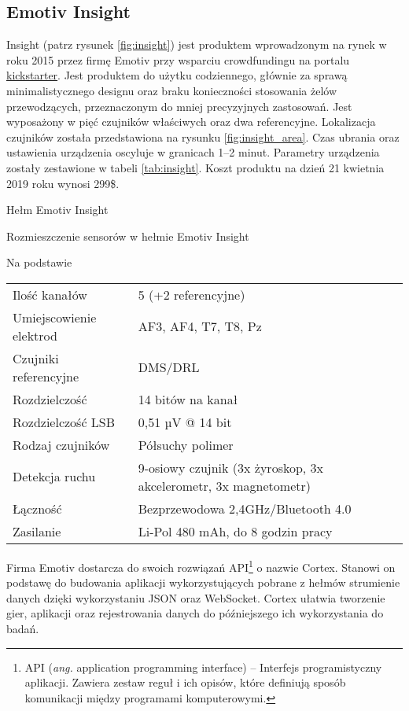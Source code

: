\documentclass[skorowidz,skroty]{dyplomWEZUT}
\begin{document}
\subsection{Emotiv Insight\label{subsection:insight}}
Insight (patrz rysunek \vref{fig:insight}) jest produktem wprowadzonym na rynek w roku 2015 przez firmę Emotiv przy wsparciu crowdfundingu na portalu \href{www.kickstarter.com}{kickstarter}. Jest produktem do użytku codziennego, głównie za sprawą minimalistycznego designu oraz braku konieczności stosowania żelów przewodzących, przeznaczonym do mniej precyzyjnych zastosowań. Jest wyposażony w pięć czujników właściwych oraz dwa referencyjne. Lokalizacja czujników została przedstawiona na rysunku \vref{fig:insight_area}. Czas ubrania oraz ustawienia urządzenia oscyluje w granicach 1--2 minut. Parametry urządzenia zostały zestawione w tabeli \vref{tab:insight}. Koszt produktu na dzień 21 kwietnia 2019 roku wynosi 299\$.

{Hełm Emotiv Insight\label{fig:insight}}
{\cite{emotiv_insight}}

{Rozmieszczenie sensorów w hełmie Emotiv Insight\label{fig:insight_area}}
{\cite{emotiv_insight}}

{Na podstawie \cite{emotiv_comparison}}
{
    \begin{tabular}{l|l}
        Ilość kanałów & 5 (+2 referencyjne)\\
        Umiejscowienie elektrod & AF3, AF4, T7, T8, Pz\\
        Czujniki referencyjne & DMS/DRL\\
        Rozdzielczość & 14 bitów na kanał\\
        Rozdzielczość LSB & 0,51 µV @ 14 bit\\
        Rodzaj czujników & Półsuchy polimer\\
        Detekcja ruchu & 9-osiowy czujnik (3x żyroskop, 3x akcelerometr, 3x magnetometr)\\
        Łączność & Bezprzewodowa 2,4GHz/Bluetooth 4.0\\
        Zasilanie & Li-Pol 480 mAh, do 8 godzin pracy
    \end{tabular}
}

Firma Emotiv dostarcza do swoich rozwiązań API\footnote{API (\textit{ang.} application programming interface) -- Interfejs programistyczny aplikacji. Zawiera zestaw reguł i ich opisów, które definiują sposób komunikacji między programami komputerowymi.} o nazwie Cortex. Stanowi on podstawę do budowania aplikacji wykorzystujących pobrane z hełmów strumienie danych dzięki wykorzystaniu JSON oraz WebSocket\cite{emotiv_developer}. Cortex ułatwia tworzenie gier, aplikacji oraz rejestrowania danych do późniejszego ich wykorzystania do badań.
\end{document}
